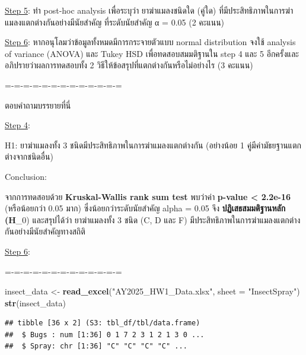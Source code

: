 \documentclass[
]{article}
\newenvironment{Shaded}{\begin{snugshade}}{\end{snugshade}}
\newcommand{\AttributeTok}[1]{\textcolor[rgb]{0.13,0.29,0.53}{#1}}
\newcommand{\CommentTok}[1]{\textcolor[rgb]{0.56,0.35,0.01}{\textit{#1}}}
\newcommand{\FunctionTok}[1]{\textcolor[rgb]{0.13,0.29,0.53}{\textbf{#1}}}
\newcommand{\NormalTok}[1]{#1}
\newcommand{\OtherTok}[1]{\textcolor[rgb]{0.56,0.35,0.01}{#1}}
\newcommand{\SpecialCharTok}[1]{\textcolor[rgb]{0.81,0.36,0.00}{\textbf{#1}}}
\newcommand{\StringTok}[1]{\textcolor[rgb]{0.31,0.60,0.02}{#1}}
\begin{document}
\ul{Step 5}: ทำ post-hoc analysis เพื่อระบุว่า ยาฆ่าแมลงชนิดใด (คู่ใด)
ที่มีประสิทธิภาพในการฆ่าแมลงแตกต่างกันอย่างมีนัยสำคัญ ที่ระดับนัยสำคัญ α = 0.05 (2 คะแนน)

\ul{Step 6}: หากอนุโลมว่าข้อมูลทั้งหมดมีการกระจายตัวแบบ normal distribution จงใช้
analysis of variance (ANOVA) และ Tukey HSD เพื่อทดสอบสมมติฐานใน step 4 และ
5 อีกครั้งและอภิปรายว่าผลการทดสอบทั้ง 2 วิธีให้ข้อสรุปที่แตกต่างกันหรือไม่อย่างไร (3 คะแนน)

=-=-=-=-=-=-=-=-=-=-=-=-=

ตอบคำถามบรรยายที่นี่

\ul{Step 4}:

H1: ยาฆ่าแมลงทั้ง 3 ชนิดมีประสิทธิภาพในการฆ่าแมลงแตกต่างกัน (อย่างน้อย 1
คู่มีค่ามัธยฐานแตกต่างจากชนิดอื่น)

Conclusion:

จากการทดสอบด้วย \textbf{Kruskal-Wallis rank sum test} พบว่าค่า
\textbf{p-value \textless{} 2.2e-16} (หรือน้อยกว่า 0.05 มาก)
ซึ่งน้อยกว่าระดับนัยสำคัญ alpha = 0.05 จึง \textbf{ปฏิเสธสมมติฐานหลัก (H}\_0)
และสรุปได้ว่า ยาฆ่าแมลงทั้ง 3 ชนิด (C, D และ F)
มีประสิทธิภาพในการฆ่าแมลงแตกต่างกันอย่างมีนัยสำคัญทางสถิติ

\ul{Step 6}:

=-=-=-=-=-=-=-=-=-=-=-=-=

\begin{Shaded}
\begin{Highlighting}[]
\NormalTok{insect\_data }\OtherTok{\textless{}{-}} \FunctionTok{read\_excel}\NormalTok{(}\StringTok{"AY2025\_HW1\_Data.xlsx"}\NormalTok{, }\AttributeTok{sheet =} \StringTok{"InsectSpray"}\NormalTok{)}
\FunctionTok{str}\NormalTok{(insect\_data)}
\end{Highlighting}
\end{Shaded}

\begin{verbatim}
## tibble [36 x 2] (S3: tbl_df/tbl/data.frame)
##  $ Bugs : num [1:36] 0 1 7 2 3 1 2 1 3 0 ...
##  $ Spray: chr [1:36] "C" "C" "C" "C" ...
\end{verbatim}

\begin{Shaded}
\end{Shaded}
\end{document}
